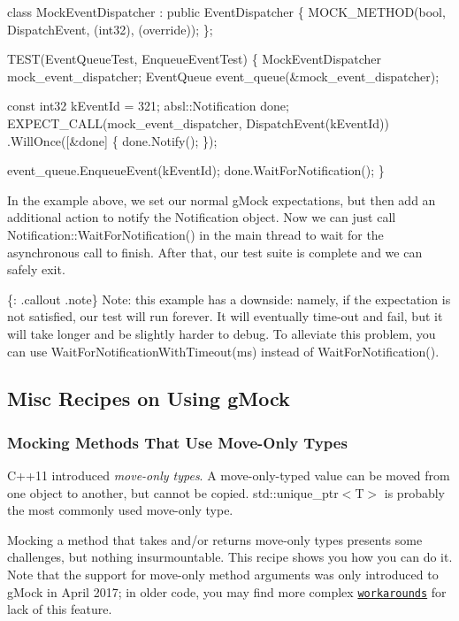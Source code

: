 \begin{DoxyCode}
\textcolor{keyword}{class }MockEventDispatcher : \textcolor{keyword}{public} EventDispatcher \{
  MOCK\_METHOD(\textcolor{keywordtype}{bool}, DispatchEvent, (int32), (\textcolor{keyword}{override}));
\};

TEST(EventQueueTest, EnqueueEventTest) \{
  MockEventDispatcher mock\_event\_dispatcher;
  EventQueue event\_queue(&mock\_event\_dispatcher);

  \textcolor{keyword}{const} int32 kEventId = 321;
  absl::Notification done;
  EXPECT\_CALL(mock\_event\_dispatcher, DispatchEvent(kEventId))
      .WillOnce([&done] \{ done.Notify(); \});

  event\_queue.EnqueueEvent(kEventId);
  done.WaitForNotification();
\}
\end{DoxyCode}


In the example above, we set our normal g\+Mock expectations, but then add an additional action to notify the {\ttfamily Notification} object. Now we can just call {\ttfamily Notification\+::\+Wait\+For\+Notification()} in the main thread to wait for the asynchronous call to finish. After that, our test suite is complete and we can safely exit.

\{\+: .callout .note\} Note\+: this example has a downside\+: namely, if the expectation is not satisfied, our test will run forever. It will eventually time-\/out and fail, but it will take longer and be slightly harder to debug. To alleviate this problem, you can use {\ttfamily Wait\+For\+Notification\+With\+Timeout(ms)} instead of {\ttfamily Wait\+For\+Notification()}.

\subsection*{Misc Recipes on Using g\+Mock}

\subsubsection*{Mocking Methods That Use Move-\/\+Only Types}

C++11 introduced {\itshape move-\/only types}. A move-\/only-\/typed value can be moved from one object to another, but cannot be copied. {\ttfamily std\+::unique\+\_\+ptr$<$T$>$} is probably the most commonly used move-\/only type.

Mocking a method that takes and/or returns move-\/only types presents some challenges, but nothing insurmountable. This recipe shows you how you can do it. Note that the support for move-\/only method arguments was only introduced to g\+Mock in April 2017; in older code, you may find more complex \href{#LegacyMoveOnly}{\tt workarounds} for lack of this feature.

